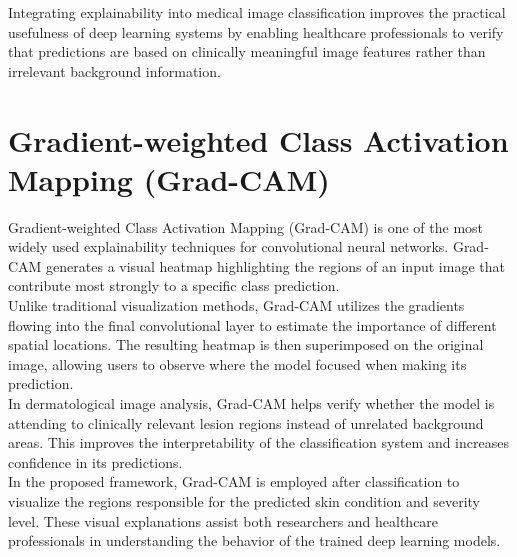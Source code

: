 Integrating explainability into medical image classification improves the practical usefulness of deep learning systems by enabling healthcare professionals to verify that predictions are based on clinically meaningful image features rather than irrelevant background information.

\section{Gradient-weighted Class Activation Mapping (Grad-CAM)}
Gradient-weighted Class Activation Mapping (Grad-CAM) is one of the most widely used explainability techniques for convolutional neural networks. Grad-CAM generates a visual heatmap highlighting the regions of an input image that contribute most strongly to a specific class prediction.\\
Unlike traditional visualization methods, Grad-CAM utilizes the gradients flowing into the final convolutional layer to estimate the importance of different spatial locations. The resulting heatmap is then superimposed on the original image, allowing users to observe where the model focused when making its prediction.\\
In dermatological image analysis, Grad-CAM helps verify whether the model is attending to clinically relevant lesion regions instead of unrelated background areas. This improves the interpretability of the classification system and increases confidence in its predictions.\\
In the proposed framework, Grad-CAM is employed after classification to visualize the regions responsible for the predicted skin condition and severity level. These visual explanations assist both researchers and healthcare professionals in understanding the behavior of the trained deep learning models.

